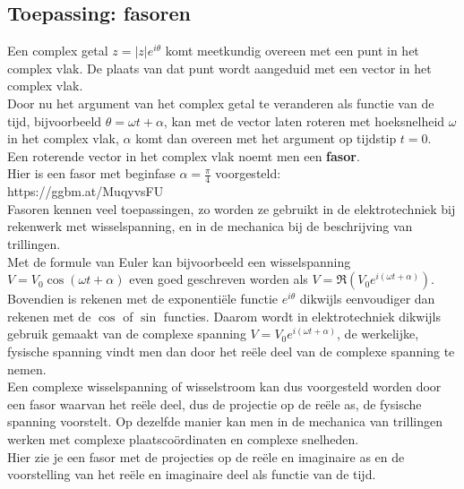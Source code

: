 
\subsection{Toepassing: fasoren}

Een complex getal $z=|z|e^{i\theta}$ komt meetkundig overeen met een punt in het complex vlak. De plaats van dat punt wordt aangeduid met een vector in het complex vlak.\\
Door nu het argument van het complex getal te veranderen als functie van de tijd, bijvoorbeeld $\theta= \omega t + \alpha$, kan met de vector laten roteren met hoeksnelheid $\omega$ in het complex vlak, $\alpha$ komt dan overeen met het argument op tijdstip $t=0$.\\
Een roterende vector in het complex vlak noemt men een {\bf fasor}.\\

Hier is een fasor met beginfase $\alpha=\frac{\pi}{4}$ voorgesteld:\\

https://ggbm.at/MuqyvsFU   \\

Fasoren kennen veel toepassingen, zo worden ze gebruikt in de elektrotechniek bij rekenwerk met wisselspanning, en in de mechanica bij de beschrijving van trillingen. \\ 
Met de formule van Euler kan bijvoorbeeld een wisselspanning $V=V_{0}\cos(\omega t + \alpha)$ even goed geschreven worden als $V=\Re (V_{0}e^{i(\omega t + \alpha)}) $. Bovendien is rekenen met de exponenti\"{e}le functie $e^{i\theta}$ dikwijls eenvoudiger dan rekenen met de $\cos$ of $\sin$ functies. Daarom wordt in elektrotechniek dikwijls gebruik gemaakt van de complexe spanning $V=V_{0}e^{i(\omega t + \alpha)}$, de werkelijke, fysische spanning vindt men dan door het re\"{e}le deel van de complexe spanning te nemen.\\
Een complexe wisselspanning of wisselstroom kan dus voorgesteld worden door een fasor waarvan het re\"{e}le deel, dus de projectie op de re\"{e}le as, de fysische spanning voorstelt.  Op dezelfde manier kan men in de mechanica van trillingen werken met complexe plaatsco\"{o}rdinaten en complexe snelheden.\\

Hier zie je een fasor met de projecties op de re\"{e}le en imaginaire as en de voorstelling van het re\"{e}le en imaginaire deel als functie van de tijd. \\

